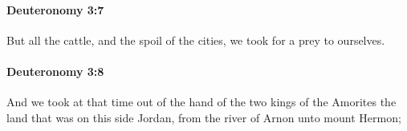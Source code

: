 		\paragraph{Deuteronomy 3:7} %
			\label{DEUTERONOMY-3-7}

			But all the cattle, and the spoil of the cities, we took for a prey to ourselves.


		\paragraph{Deuteronomy 3:8} %
			\label{DEUTERONOMY-3-8}

			And we took at that time out of the hand of the two kings of the Amorites the land that was on this side Jordan, from the river of Arnon unto mount Hermon;


